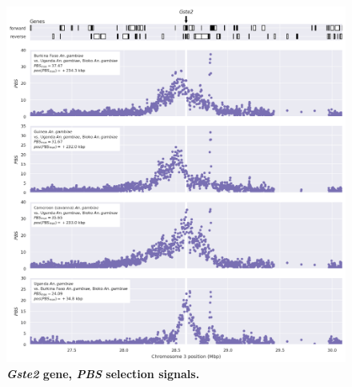 \documentclass[a4paper,11pt,abstracton,hidelinks]{scrartcl}
\begin{document}
\clearpage
\begin{figure}[t!]
	\begin{center}
		\includegraphics*[width=1.1\linewidth,center]{artwork/locus_gste2_pbs.png}
	\end{center}
	\caption[\textit{Gste2} gene, \textit{PBS} selection signals]{
	\textbf{\textit{Gste2} gene, \textit{PBS} selection signals.} 
	} 
	\label{fig:locus_gste2_pbs}
\end{figure}


\clearpage
\end{document}
